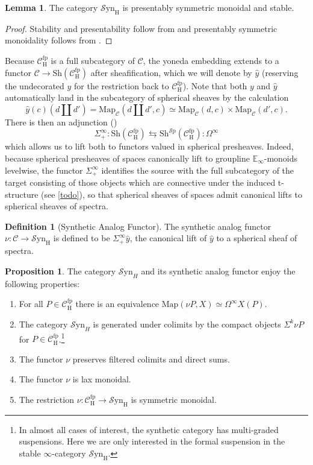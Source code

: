 \documentclass[10pt]{amsart}
\theoremstyle{definition}
\numberwithin{figure}{section}
\numberwithin{equation}{section}
\newtheorem{lemma}[figure]{Lemma}
\newtheorem{proposition}[figure]{Proposition}
\newtheorem{definition}[figure]{Definition}
\newcommand{\cC}{\mathcal{C}}
\theoremstyle{cited}
\newcommand{\bE}{\mathbb{E}}
\newcommand{\Sp}{{\mathcal{S}\mathrm{p}}}
\newcommand{\Map}{\mathrm{Map}}
\newcommand{\Sh}{\mathrm{Sh}}
\newcommand{\fp}{\mathrm{fp}}
\newcommand{\Syn}{\mathcal{S}\mathrm{yn}}
\renewcommand{\H}{\mathrm{H}}
\begin{document}
\begin{lemma}\label{lem:synispsms}
  The category $\Syn_\H$ is presentably symmetric monoidal and stable.
\end{lemma}

\begin{proof}
  Stability and presentability follow from \cite[Corollary 2.13]{Pst22} and presentably symmetric monoidality follows from \cite[Proposition 2.30]{Pst22}.
\end{proof}

Because $\cC_\H^\fp$ is a full subcategory of $\cC$, the yoneda embedding extends to a functor $\cC\to \Sh(\cC_\H^\fp)$ after sheafification, which we will denote by $\hat y$ (reserving the undecorated $y$ for the restriction back to $\cC^\fp_\H$). Note that both $y$ and $\hat y$ automatically land in the subcategory of spherical sheaves by the calculation
\[
  \hat y(c)(d\amalg d')=\Map_{\cC}(d\amalg d', c)\simeq \Map_{\cC}(d, c)\times \Map_{\cC}(d', c).
\]
There is then an adjunction (\cite{Pst22})
\[
\Sigma^\infty_+:\Sh(\cC_\H^\fp) \leftrightarrows \Sh^\Sp(\cC_\H^\fp):\Omega^\infty
\]
which allows us to lift both to functors valued in spherical presheaves. Indeed, because spherical presheaves of spaces canonically lift to groupline $\bE_\infty$-monoids levelwise, the functor $\Sigma_+^\infty$ identifies the source with the full subcategory of the target consisting of those objects which are connective under the induced t-structure (see \ref{todo}), so that spherical sheaves of spaces admit canonical lifts to spherical sheaves of spectra.

\begin{definition}[Synthetic Analog Functor]\label{def:synanalog}
  The synthetic analog functor $\nu:\cC\to \Syn_\H$ is defined to be $\Sigma_+^\infty \hat y$, the canonical lift of $\hat y$ to a spherical sheaf of spectra.
\end{definition}

\begin{proposition}\label{prop:analogprops}
   The category $\Syn_H$ and its synthetic analog functor enjoy the following properties:
   \begin{enumerate}
    \item For all $P\in \cC_\H^\fp$ there is an equivalence $\Map(\nu P, X)\simeq \Omega^\infty X(P)$.
    \item The category $\Syn_H$ is generated under colimits by the compact objects $\Sigma^{k}\nu P$ for $P\in \cC_\H^\fp$.\footnote{In almost all cases of interest, the synthetic category has multi-graded suspensions. Here we are only interested in the formal suspension in the stable $\infty$-category $\Syn_\H$.}
    \item The functor $\nu$ preserves filtered colimits and direct sums.
    \item The functor $\nu$ is lax monoidal.
    \item The restriction $\nu:\cC_\H^\fp\to \Syn_\H$ is symmetric monoidal.
   \end{enumerate}  
\end{proposition}
\end{document}
